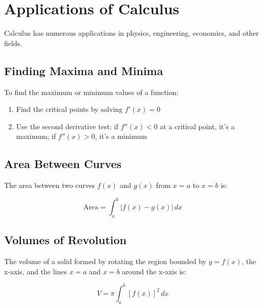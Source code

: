 \documentclass{article}
\begin{document}
\section{Applications of Calculus}

Calculus has numerous applications in physics, engineering, economics, and other fields.

\subsection{Finding Maxima and Minima}

To find the maximum or minimum values of a function:
\begin{enumerate}
  \item Find the critical points by solving $f'(x) = 0$
  \item Use the second derivative test: if $f''(x) < 0$ at a critical point, it's a maximum; if $f''(x) > 0$, it's a minimum
\end{enumerate}

\subsection{Area Between Curves}

The area between two curves $f(x)$ and $g(x)$ from $x = a$ to $x = b$ is:

$$\text{Area} = \int_a^b |f(x) - g(x)| \, dx$$

\subsection{Volumes of Revolution}

The volume of a solid formed by rotating the region bounded by $y = f(x)$, the x-axis, and the lines $x = a$ and $x = b$ around the x-axis is:

$$V = \pi \int_a^b [f(x)]^2 \, dx$$
\end{document}
